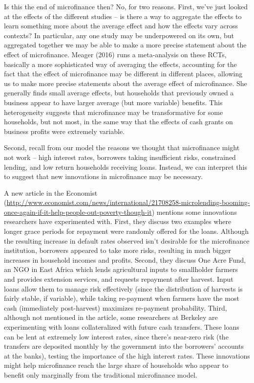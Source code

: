 \documentclass[12pt,english]{article}
\begin{document}
Is this the end of microfinance then? No, for two reasons. First, we've just looked at the effects of the different studies -- is there a way to aggregate the effects to learn something more about the average effect and how the effects vary across contexts? In particular, any one study may be underpowered on its own, but aggregated together we may be able to make a more precise statement about the effect of microfinance. Meager (2016) runs a meta-analysis on these RCTs, basically a more sophisticated way of averaging the effects, accounting for the fact that the effect of microfinance may be different in different places, allowing us to make more precise statements about the average effect of microfinance. She generally finds small average effects, but households that previously owned a business appear to have larger average (but more variable) benefits. This heterogeneity suggests that microfinance may be transformative for some households, but not most, in the same way that the effects of cash grants on business profits were extremely variable.

Second, recall from our model the reasons we thought that microfinance might not work -- high interest rates, borrowers taking insufficient risks, constrained lending, and low return households receiving loans. Instead, we can interpret this to suggest that new innovations in microfinance may be necessary.

A new article in the Economist (\href{http://www.economist.com/news/international/21708258-microlending-booming-once-again-if-it-help-people-out-poverty-though-it}{http://www.economist.com/news/international/21708258-microlending-booming-once-again-if-it-help-people-out-poverty-though-it}) mentions some innovations researchers have experimented with. First, they discuss two examples where longer grace periods for repayment were randomly offered for the loans. Although the resulting increase in default rates observed isn't desirable for the microfinance institution, borrowers appeared to take more risks, resulting in much bigger increases in household incomes and profits. Second, they discuss One Acre Fund, an NGO in East Africa which lends agricultural inputs to smallholder farmers and provides extension services, and requests repayment after harvest. Input loans allow them to manage risk effectively (since the distribution of harvests is fairly stable, if variable), while taking re-payment when farmers have the most cash (immediately post-harvest) maximizes re-payment probability. Third, although not mentioned in the article, some researchers at Berkeley are experimenting with loans collateralized with future cash transfers. These loans can be lent at extremely low interest rates, since there's near-zero risk (the transfers are deposited monthly by the government into the borrowers' accounts at the banks), testing the importance of the high interest rates. These innovations might help microfinance reach the large share of households who appear to benefit only marginally from the traditional microfinance model.
\end{document}
